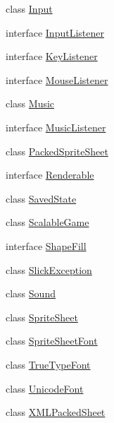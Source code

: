 \begin{DoxyCompactItemize}
class \mbox{\hyperlink{classorg_1_1newdawn_1_1slick_1_1_input}{Input}}
\item 
interface \mbox{\hyperlink{interfaceorg_1_1newdawn_1_1slick_1_1_input_listener}{Input\+Listener}}
\item 
interface \mbox{\hyperlink{interfaceorg_1_1newdawn_1_1slick_1_1_key_listener}{Key\+Listener}}
\item 
interface \mbox{\hyperlink{interfaceorg_1_1newdawn_1_1slick_1_1_mouse_listener}{Mouse\+Listener}}
\item 
class \mbox{\hyperlink{classorg_1_1newdawn_1_1slick_1_1_music}{Music}}
\item 
interface \mbox{\hyperlink{interfaceorg_1_1newdawn_1_1slick_1_1_music_listener}{Music\+Listener}}
\item 
class \mbox{\hyperlink{classorg_1_1newdawn_1_1slick_1_1_packed_sprite_sheet}{Packed\+Sprite\+Sheet}}
\item 
interface \mbox{\hyperlink{interfaceorg_1_1newdawn_1_1slick_1_1_renderable}{Renderable}}
\item 
class \mbox{\hyperlink{classorg_1_1newdawn_1_1slick_1_1_saved_state}{Saved\+State}}
\item 
class \mbox{\hyperlink{classorg_1_1newdawn_1_1slick_1_1_scalable_game}{Scalable\+Game}}
\item 
interface \mbox{\hyperlink{interfaceorg_1_1newdawn_1_1slick_1_1_shape_fill}{Shape\+Fill}}
\item 
class \mbox{\hyperlink{classorg_1_1newdawn_1_1slick_1_1_slick_exception}{Slick\+Exception}}
\item 
class \mbox{\hyperlink{classorg_1_1newdawn_1_1slick_1_1_sound}{Sound}}
\item 
class \mbox{\hyperlink{classorg_1_1newdawn_1_1slick_1_1_sprite_sheet}{Sprite\+Sheet}}
\item 
class \mbox{\hyperlink{classorg_1_1newdawn_1_1slick_1_1_sprite_sheet_font}{Sprite\+Sheet\+Font}}
\item 
class \mbox{\hyperlink{classorg_1_1newdawn_1_1slick_1_1_true_type_font}{True\+Type\+Font}}
\item 
class \mbox{\hyperlink{classorg_1_1newdawn_1_1slick_1_1_unicode_font}{Unicode\+Font}}
\item 
class \mbox{\hyperlink{classorg_1_1newdawn_1_1slick_1_1_x_m_l_packed_sheet}{X\+M\+L\+Packed\+Sheet}}
\end{DoxyCompactItemize}
